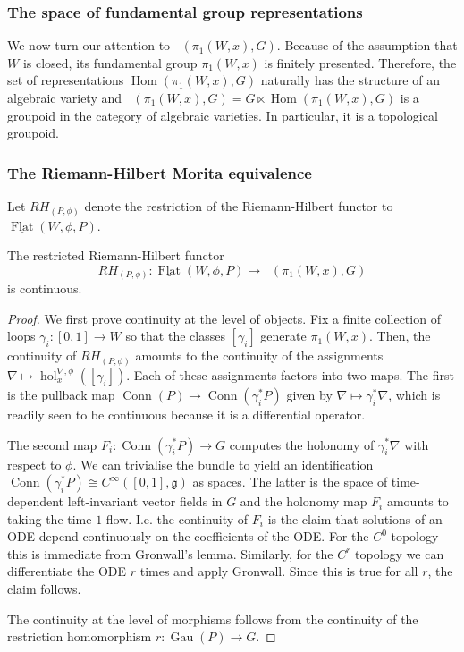 \documentclass[10pt]{amsart}
\newcommand{\Hom}{\operatorname{Hom}}
\newcommand{\hol}{{\operatorname{hol}}}
\newcommand{\FlatCat}{{\underline{\operatorname{Flat}}}}
\DeclareMathOperator{\Rep}{\underline{\operatorname{Rep}}}
\newcommand{\Conn}{{\operatorname{Conn}}}
\DeclareMathOperator{\Gau}{Gau}
\numberwithin{theoremalpha}{section}
\numberwithin{equation}{section}
\numberwithin{definition}{section}
\numberwithin{theorem}{section}
\numberwithin{proposition}{section}
\numberwithin{lemma}{section}
\numberwithin{example}{section}
\numberwithin{remark}{section}
\numberwithin{corollary}{section}
\numberwithin{question}{section}
\numberwithin{problem}{section}
\numberwithin{assumption}{section}
\theoremstyle{named}
\numberwithin{equation}{section}
\begin{document}
\subsubsection{The space of fundamental group representations}

We now turn our attention to $\Rep(\pi_{1}(W, x), G)$. Because of the assumption that $W$ is closed, its fundamental group $\pi_{1}(W, x)$ is finitely presented. Therefore, the set of representations $\Hom(\pi_{1}(W,x), G)$ naturally has the structure of an algebraic variety and $\Rep(\pi_{1}(W, x), G) = G \ltimes \Hom(\pi_{1}(W,x), G)$ is a groupoid in the category of algebraic varieties. In particular, it is a topological groupoid. 

\subsubsection{The Riemann-Hilbert Morita equivalence}

Let $RH_{(P,\phi)}$ denote the restriction of the Riemann-Hilbert functor to $\FlatCat(W, \phi, P)$.
\begin{lemma} \label{continuityofRH}
The restricted Riemann-Hilbert functor 
\[ RH_{(P,\phi)} : \FlatCat(W, \phi, P) \to \Rep(\pi_{1}(W, x), G) \]
is continuous. 
\end{lemma}
\begin{proof}
We first prove continuity at the level of objects. Fix a finite collection of loops $\gamma_i: [0,1] \rightarrow W$ so that the classes $[\gamma_i]$ generate $\pi_1(W,x)$. Then, the continuity of $RH_{(P,\phi)}$ amounts to the continuity of the assignments $\nabla \mapsto \hol_{x}^{\nabla, \phi}([\gamma_i])$. Each of these assignments factors into two maps. The first is the pullback map $\Conn(P) \rightarrow \Conn(\gamma_i^*P)$ given by $\nabla \mapsto \gamma_i^*\nabla$, which is readily seen to be continuous because it is a differential operator.

The second map $F_i: \Conn(\gamma_i^*P) \rightarrow G$ computes the holonomy of $\gamma_i^*\nabla$ with respect to $\phi$. We can trivialise the bundle to yield an identification $\Conn(\gamma_i^*P) \cong C^\infty([0,1],\mathfrak{g})$ as spaces. The latter is the space of time-dependent left-invariant vector fields in $G$ and the holonomy map $F_i$ amounts to taking the time-$1$ flow. I.e. the continuity of $F_i$ is the claim that solutions of an ODE depend continuously on the coefficients of the ODE. For the $C^0$ topology this is immediate from Gronwall's lemma. Similarly, for the $C^r$ topology we can differentiate the ODE $r$ times and apply Gronwall. Since this is true for all $r$, the claim follows.

The continuity at the level of morphisms follows from the continuity of the restriction homomorphism $r: \Gau(P) \to G$.
\end{proof}
\end{document}
